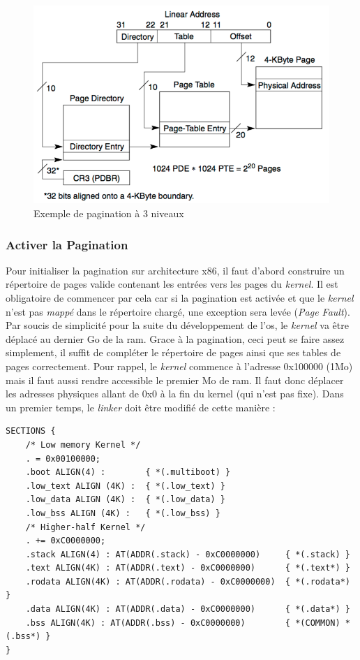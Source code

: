 \begin{figure}[!h]
  \centering
  \includegraphics[scale=0.85]{images/paging3.png}
  \caption{Exemple de pagination à 3 niveaux}
  \label{paging3}
\end{figure}


\subsubsection{Activer la Pagination}
Pour initialiser la pagination sur architecture x86, il faut d'abord construire
un répertoire de pages valide contenant les entrées vers les pages du \textit{kernel}.
Il est obligatoire de commencer par cela car si la pagination est activée et que
le \textit{kernel} n'est pas \textit{mappé} dans le répertoire chargé, une exception
sera levée (\textit{Page Fault}). Par soucis de simplicité pour la suite du développement
de l'\acrshort{os}, le \textit{kernel} va être déplacé au dernier Go de la \acrshort{ram}.
Grace à la pagination, ceci peut se faire assez simplement, il suffit de compléter
le répertoire de pages ainsi que ses tables de pages correctement. Pour rappel,
le \textit{kernel} commence à l'adresse 0x100000 (1Mo) mais il faut aussi rendre
accessible le premier Mo de \acrshort{ram}. Il faut donc déplacer les adresses physiques
allant de 0x0 à la fin du kernel (qui n'est pas fixe). Dans un premier temps, le
\textit{linker} doit être modifié de cette manière :

\begin{verbatim}
SECTIONS {
    /* Low memory Kernel */
    . = 0x00100000;
    .boot ALIGN(4) :        { *(.multiboot) }
    .low_text ALIGN (4K) :  { *(.low_text) }
    .low_data ALIGN (4K) :  { *(.low_data) }
    .low_bss ALIGN (4K) :   { *(.low_bss) }
    /* Higher-half Kernel */
    . += 0xC0000000;
    .stack ALIGN(4) : AT(ADDR(.stack) - 0xC0000000)     { *(.stack) }
    .text ALIGN(4K) : AT(ADDR(.text) - 0xC0000000)      { *(.text*) }
    .rodata ALIGN(4K) : AT(ADDR(.rodata) - 0xC0000000)  { *(.rodata*) }
    .data ALIGN(4K) : AT(ADDR(.data) - 0xC0000000)      { *(.data*) }
    .bss ALIGN(4K) : AT(ADDR(.bss) - 0xC0000000)        { *(COMMON) *(.bss*) }
}
\end{verbatim}

